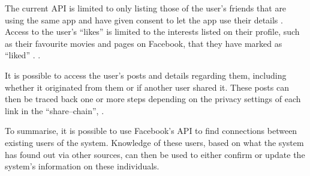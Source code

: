 The current \ac{API} is limited to only listing those of the user's friends
that are using the same app and have given consent to let the app use their
details \citep{FacebookChangesInGraphTwoPointOh}. Access to the user's ``likes''
is limited to the interests listed on their profile, such as their favourite
movies and pages on Facebook, that they have marked as ``liked''
\citep{FacebookGraphApiUserEdges, FacebookGraphApiUserLikes}.
.\nl

It is possible to access the user's posts and details regarding them, including
whether it originated from them or if another user shared it. These posts can
then be traced back one or more steps depending on the privacy settings of each
link in the ``share--chain'', .\nl

To summarise, it is possible to use Facebook's \ac{API} to find connections
between existing users of the system. Knowledge of these users, based on what
the system has found out via other sources, can then be used to either confirm
or update the system's information on these individuals.